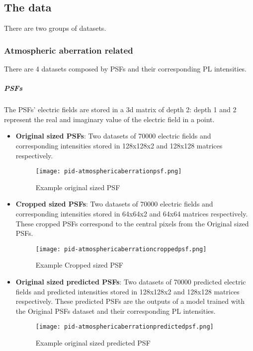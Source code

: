 \subsection{The data}
	There are two groups of datasets.
	
	\subsubsection{Atmospheric aberration related}
	
		There are 4 datasets composed by PSFs and their corresponding PL intensities.
		
		\subparagraph{PSFs}
			The PSFs' electric fields are stored in a 3d matrix of depth 2: depth 1 and 2 represent the real and imaginary value of the electric field in a point.
			\begin{itemize}
				\item \textbf{Original sized PSFs}: Two datasets of 70000 electric fields and corresponding intensities stored in 128x128x2 and 128x128 matrices respectively.
				\begin{figure*}[ht!]
					\centering
					\texttt{[image: pid-atmosphericaberrationpsf.png]}
					\caption{Example original sized PSF}\hspace{\fill}
				\end{figure*}				
				\item \textbf{Cropped sized PSFs}:  Two datasets of 70000 electric fields and corresponding intensities stored in 64x64x2 and 64x64 matrices respectively. These cropped  PSFs correspond to the central pixels from the Original sized PSFs.
				\begin{figure*}[ht!]
					\centering
					\texttt{[image: pid-atmosphericaberrationcroppedpsf.png]}
					\caption{Example Cropped sized PSF}\hspace{\fill}
				\end{figure*}			
				\item \textbf{Original sized predicted PSFs}:  Two datasets of 70000 predicted electric fields and predicted intensities stored in 128x128x2 and 128x128 matrices respectively. These predicted PSFs are the outputs of a model trained with the Original PSFs dataset and their corresponding PL intensities.
				\begin{figure*}[ht!]
					\centering
					\texttt{[image: pid-atmosphericaberrationpredictedpsf.png]}
					\caption{Example original sized predicted PSF}\hspace{\fill}

\end{figure*}
\end{itemize}
